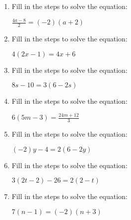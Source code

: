 \documentclass{article}%
\begin{document}
%
\normalsize%
\section{}%
\label{sec:}%

    \begin{center}
    \end{center}
    \vspace{0.1in}
\begin{multicols}{2}%
\begin{enumerate}[label=\arabic*),start=1]%
\item%
Fill in the steps to solve the equation: 

$\frac{4 a - 8}{2}=\left(-2\right) \left(a + 2\right)$%
\newline%
\newline%
%
\vspace{4cm}%
\item%
Fill in the steps to solve the equation: 

$4 \left(2 x - 1\right)=4 x + 6$%
\newline%
\newline%
%
\vspace{4cm}%
\item%
Fill in the steps to solve the equation: 

$8 s - 10=3 \left(6 - 2 s\right)$%
\newline%
\newline%
%
\vspace{4cm}%
\item%
Fill in the steps to solve the equation: 

$6 \left(5 m - 3\right)=\frac{24 m + 12}{3}$%
\newline%
\newline%
%
\vspace{4cm}%
\item%
Fill in the steps to solve the equation: 

$\left(-2\right) y - 4=2 \left(6 - 2 y\right)$%
\newline%
\newline%
%
\vspace{4cm}%
\item%
Fill in the steps to solve the equation: 

$3 \left(2 t - 2\right) - 26=2 \left(2 - t\right)$%
\newline%
\newline%
%
\vspace{4cm}%
\item%
Fill in the steps to solve the equation: 

$7 \left(n - 1\right)=\left(-2\right) \left(n + 3\right)$%
\newline%
\newline%
%
\vspace{4cm}%
\end{enumerate}

%
\end{multicols}%
\end{document}
